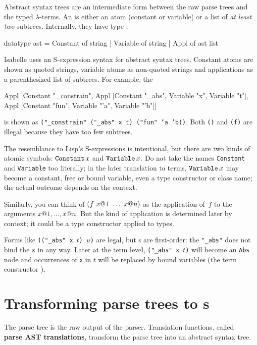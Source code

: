 Abstract syntax trees are an intermediate form between the raw parse trees
and the typed $\lambda$-terms.  An \AST{} is either an atom (constant or
variable) or a list of {\em at least two\/} subtrees.  Internally, they
have type :  
\begin{ttbox}
datatype ast = Constant of string
             | Variable of string
             | Appl of ast list
\end{ttbox}
%
Isabelle uses an S-expression syntax for abstract syntax trees.  Constant
atoms are shown as quoted strings, variable atoms as non-quoted strings and
applications as a parenthesized list of subtrees.  For example, the \AST
\begin{ttbox}
Appl [Constant "_constrain",
      Appl [Constant "_abs", Variable "x", Variable "t"],
      Appl [Constant "fun", Variable "'a", Variable "'b"]]
\end{ttbox}
is shown as {\tt ("_constrain" ("_abs" x t) ("fun" 'a 'b))}.
Both {\tt ()} and {\tt (f)} are illegal because they have too few
subtrees. 

The resemblance to Lisp's S-expressions is intentional, but there are two
kinds of atomic symbols: $\mathop{\mbox{\tt Constant}}\nolimits x$ and $\mathop{\mbox{\tt Variable}}\nolimits x$.  Do not take the
names {\tt Constant} and {\tt Variable} too literally; in the later
translation to terms, $\mathop{\mbox{\tt Variable}}\nolimits x$ may become a constant, free or bound
variable, even a type constructor or class name; the actual outcome depends
on the context.

Similarly, you can think of ${\tt (} f~x@1~\ldots~x@n{\tt )}$ as the
application of~$f$ to the arguments $x@1, \ldots, x@n$.  But the kind of
application is determined later by context; it could be a type constructor
applied to types.

Forms like {\tt (("_abs" x $t$) $u$)} are legal, but \AST{}s are
first-order: the {\tt "_abs"} does not bind the {\tt x} in any way.  Later
at the term level, {\tt ("_abs" x $t$)} will become an {\tt Abs} node and
occurrences of {\tt x} in $t$ will be replaced by bound variables (the term
constructor ).


\section{Transforming parse trees to \AST{}s}\label{sec:astofpt}
\newcommand\astofpt[1]{\lbrakk#1\rbrakk}

The parse tree is the raw output of the parser.  Translation functions,
called {\bf parse AST translations},
transform the parse tree into an abstract syntax tree.

